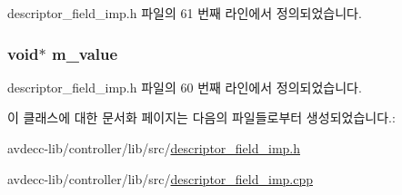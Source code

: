 descriptor\+\_\+field\+\_\+imp.\+h 파일의 61 번째 라인에서 정의되었습니다.

\subsubsection[{\texorpdfstring{m\+\_\+value}{m_value}}]{\setlength{\rightskip}{0pt plus 5cm}void$\ast$ m\+\_\+value\hspace{0.3cm}{\ttfamily [private]}}\hypertarget{classavdecc__lib_1_1descriptor__field__imp_ad864a5591872b68a638321b3e68b391f}{}\label{classavdecc__lib_1_1descriptor__field__imp_ad864a5591872b68a638321b3e68b391f}


descriptor\+\_\+field\+\_\+imp.\+h 파일의 60 번째 라인에서 정의되었습니다.



이 클래스에 대한 문서화 페이지는 다음의 파일들로부터 생성되었습니다.\+:\begin{DoxyCompactItemize}
\item 
avdecc-\/lib/controller/lib/src/\hyperlink{descriptor__field__imp_8h}{descriptor\+\_\+field\+\_\+imp.\+h}\item 
avdecc-\/lib/controller/lib/src/\hyperlink{descriptor__field__imp_8cpp}{descriptor\+\_\+field\+\_\+imp.\+cpp}\end{DoxyCompactItemize}
